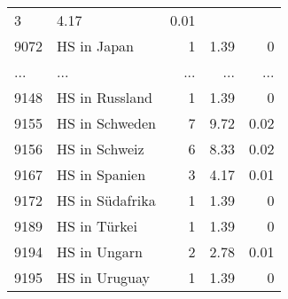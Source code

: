 \begin{longtable}{lXrrr}
          \num{3} &
          \num[round-mode=places,round-precision=2]{4,17} &
          \num[round-mode=places,round-precision=2]{0,01} \\
        9072 & \multicolumn{1}{X}{HS in Japan} & %
          \num{1} &
          \num[round-mode=places,round-precision=2]{1,39} &
          \num[round-mode=places,round-precision=2]{0} \\
       ... & ... & ... & ... & ... \\
        9148 & \multicolumn{1}{X}{HS in Russland} & %
          \num{1} &
          \num[round-mode=places,round-precision=2]{1,39} &
          \num[round-mode=places,round-precision=2]{0} \\

        9155 & \multicolumn{1}{X}{HS in Schweden} & %
          \num{7} &
          \num[round-mode=places,round-precision=2]{9,72} &
          \num[round-mode=places,round-precision=2]{0,02} \\

        9156 & \multicolumn{1}{X}{HS in Schweiz} & %
          \num{6} &
          \num[round-mode=places,round-precision=2]{8,33} &
          \num[round-mode=places,round-precision=2]{0,02} \\

        9167 & \multicolumn{1}{X}{HS in Spanien} & %
          \num{3} &
          \num[round-mode=places,round-precision=2]{4,17} &
          \num[round-mode=places,round-precision=2]{0,01} \\

        9172 & \multicolumn{1}{X}{HS in Südafrika} & %
          \num{1} &
          \num[round-mode=places,round-precision=2]{1,39} &
          \num[round-mode=places,round-precision=2]{0} \\

        9189 & \multicolumn{1}{X}{HS in Türkei} & %
          \num{1} &
          \num[round-mode=places,round-precision=2]{1,39} &
          \num[round-mode=places,round-precision=2]{0} \\

        9194 & \multicolumn{1}{X}{HS in Ungarn} & %
          \num{2} &
          \num[round-mode=places,round-precision=2]{2,78} &
          \num[round-mode=places,round-precision=2]{0,01} \\

        9195 & \multicolumn{1}{X}{HS in Uruguay} & %
          \num{1} &
          \num[round-mode=places,round-precision=2]{1,39} &
          \num[round-mode=places,round-precision=2]{0} \\


\end{longtable}

